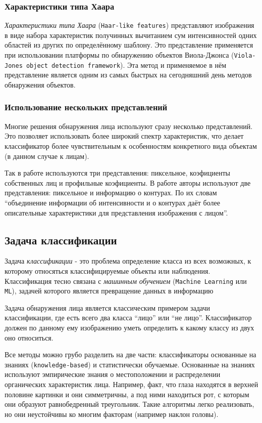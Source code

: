 \documentclass[12pt]{report}
\begin{document}
\subsubsection{Характеристики типа Хаара}
\emph{Характеристики типа Хаара} (\texttt{Haar-like features}) представляют изображения в виде набора характеристик получинных вычитанием сум интенсивностей одних областей из других по определённому шаблону. Это представление применяется при использовании платформы по обнаружению объектов Виола-Джонса (\texttt{Viola-Jones object detection framework}). \citep{viola2001rapid}
Эта метод и применяемое в нём представление является одним из самых быстрых на сегодняшний день методов обнаружения объектов.

\subsubsection{Использование нескольких представлений}
Многие решения обнаружения лица используют сразу несколько представлений. Это позволяет использовать более широкий спектр характеристик, что делает классификатор более чувствительным к особенностям конкретного вида объектам (в данном случае к лицам).

Так в работе \citep{bojkovic2006face} используются три представления: пиксельное, коэфициенты собственных лиц и профильные коэфициенты. В работе \citep{ahmadyfard2008hierarchical} авторы используют две представления: пиксельное и информацию о контурах. По их словам ``объединение информации об интенсивности и о контурах даёт более описательные характеристики для представления изображения с лицом''.

\subsection{Задача классификации}
\label{classficators}
Задача \emph{классификации} - это проблема определение класса из всех возможных, к которому относяться классифицируемые объекты или наблюдения. Классификация тесно связана с \emph{машинным обучением} (\texttt{Machine Learning} или \texttt{ML}), задачей которого является превращение данных в информацию \citep{bradski2008learning}

Задача обнаружения лица является классическим примером задачи классификации, где есть всего два класса ``лицо'' или ``не лицо''. Классификатор должен по данному ему изображению уметь определить к какому классу из двух оно относиться.

Все методы можно грубо разделить на две части: классификаторы основанные на знаниях (\texttt{knowledge-based}) и статистически обучаемые. Основанные на знаниях используют эмпирические знания о местоположении и распределении органических характеристик лица. \citep{bojkovic2006face} Например, факт, что глаза находятся в верхней половине картинки и они симметричны, а под ними находиться рот, с которым они образуют равнобедренный треугольник. Такие алгоритмы легко реализовать, но они неустойчивы ко многим факторам (например наклон головы).
\end{document}
